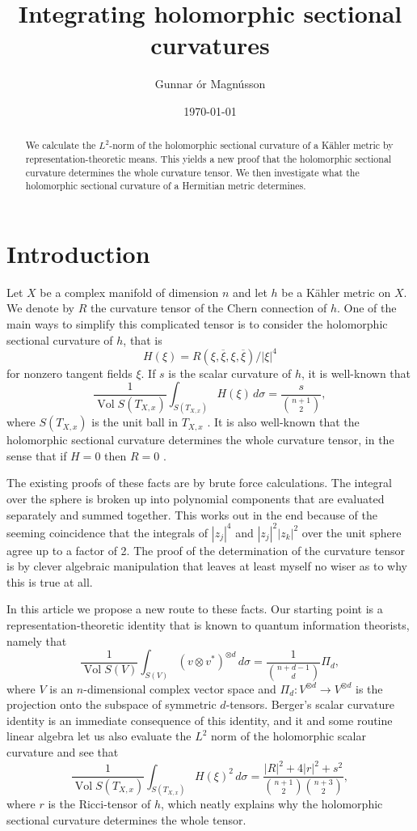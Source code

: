 \documentclass[10pt,a4paper]{amsart}
\author{Gunnar \TH\'or Magn\'usson}
\date{\today}
\title{Integrating holomorphic sectional curvatures}
\theoremstyle{definition}
\def\ov#1{\overline{#1}}
\def\d{\,d}
\DeclareMathOperator{\Vol}{Vol}
\begin{document}
\begin{abstract}
We calculate the $L^2$-norm of the holomorphic sectional curvature of a
K\"ahler metric by representation-theoretic means. This yields a new proof that
the holomorphic sectional curvature determines the whole curvature tensor.
We then investigate what the holomorphic sectional curvature of a Hermitian metric determines.
\end{abstract}

\maketitle

\section*{Introduction}

Let $X$ be a complex manifold of dimension $n$ and let $h$ be a K\"ahler metric on $X$.
We denote by $R$ the curvature tensor of the Chern connection of $h$.
One of the main ways to simplify this complicated tensor is to consider the holomorphic sectional curvature of $h$, that is
$$
H(\xi) = R(\xi, \ov{\xi}, \xi, \ov{\xi}) / |\xi|^4
$$
for nonzero tangent fields $\xi$.
If $s$ is the scalar curvature of $h$, it is well-known that
$$
\frac{1}{\Vol S(T_{X,x})} \int_{S(T_{X,x})}
\!\!\!
H(\xi) \d\sigma
= \frac{s}{\binom{n+1}{2}},
$$
where $S(T_{X,x})$ is the unit ball in $T_{X,x}$
\cite{berger1965varietes}.
It is also well-known that the holomorphic sectional curvature determines the whole curvature tensor, in the sense that if $H = 0$ then $R = 0$
\cite{zheng2000complex}.

The existing proofs of these facts are by brute force calculations.
The integral over the sphere is broken up into polynomial components that are evaluated separately and summed together.
This works out in the end because of the seeming coincidence that the integrals of $|z_j|^4$ and $|z_j|^2 |z_k|^2$ over the unit sphere agree up to a factor of 2.
The proof of the determination of the curvature tensor is by clever algebraic manipulation that leaves at least myself no wiser as to why this is true at all.

In this article we propose a new route to these facts.
Our starting point is a representation-theoretic identity that is known to
quantum information theorists, namely that
$$
\frac{1}{\Vol S(V)} \int_{S(V)} (v \otimes v^*)^{\otimes d} \d\sigma
= \frac{1}{\binom{n+d-1}{d}} \Pi_{d},
$$
where $V$ is an $n$-dimensional complex vector space and $\Pi_{d} : V^{\otimes d} \to V^{\otimes d}$ is the projection onto the subspace of symmetric $d$-tensors.
Berger's scalar curvature identity is an immediate consequence of this identity, and it and some routine linear algebra let us also evaluate the $L^2$ norm of the holomorphic scalar curvature and see that
$$
\frac{1}{\Vol S(T_{X,x})} \int_{S(T_{X,x})}
\!\!\!
H(\xi)^2 \d\sigma
= \frac{|R|^2 + 4|r|^2 + s^2}{\binom{n+1}{2}\binom{n+3}{2}},
$$
where $r$ is the Ricci-tensor of $h$, which neatly explains why the holomorphic sectional curvature determines the whole tensor.
\end{document}
